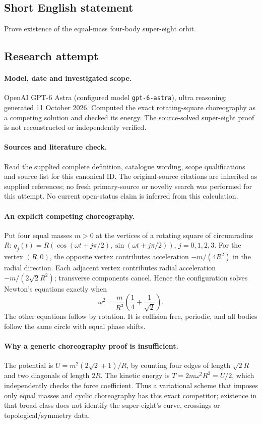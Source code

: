 \documentclass[11pt]{article}
\begin{document}
\subsection{Short English statement}
Prove existence of the equal-mass four-body super-eight orbit.
\subsection{Research attempt}
\paragraph{Model, date and investigated scope.}
OpenAI GPT-6 Astra (configured model \texttt{gpt-6-astra}), ultra reasoning; generated 11 October 2026. Computed the exact rotating-square choreography as a competing solution and checked its energy. The source-solved super-eight proof is not reconstructed or independently verified.

\paragraph{Sources and literature check.}
Read the supplied complete definition, catalogue wording, scope qualifications and source list for this canonical ID. The original-source citations are inherited as supplied references; no fresh primary-source or novelty search was performed for this attempt. No current open-status claim is inferred from this calculation.

\paragraph{An explicit competing choreography.}Put four equal masses \(m>0\) at the vertices of a rotating square of circumradius \(R\): \(q_j(t)=R(\cos(\omega t+j\pi/2),\sin(\omega t+j\pi/2))\), \(j=0,1,2,3\). For the vertex \((R,0)\), the opposite vertex contributes acceleration \(-m/(4R^2)\) in the radial direction. Each adjacent vertex contributes radial acceleration \(-m/(2\sqrt2R^2)\); transverse components cancel. Hence the configuration solves Newton's equations exactly when
\[\omega^2=\frac{m}{R^3}\left(\frac14+\frac1{\sqrt2}\right).
\]
The other equations follow by rotation. It is collision free, periodic, and all bodies follow the same circle with equal phase shifts.
\paragraph{Why a generic choreography proof is insufficient.}The potential is \(U=m^2(2\sqrt2+1)/R\), by counting four edges of length \(\sqrt2R\) and two diagonals of length \(2R\). The kinetic energy is \(T=2m\omega^2R^2=U/2\), which independently checks the force coefficient. Thus a variational scheme that imposes only equal masses and cyclic choreography has this exact competitor; existence in that broad class does not identify the super-eight's curve, crossings or topological/symmetry data.
\end{document}
